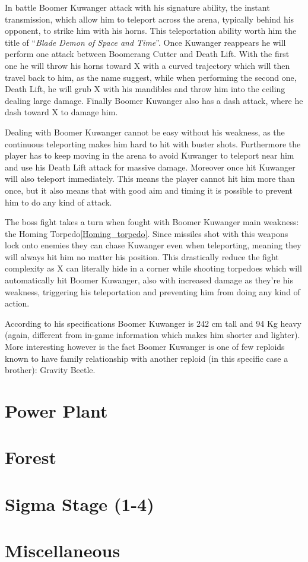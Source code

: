 In battle Boomer Kuwanger attack with his signature ability, the instant transmission, which allow him to teleport across the arena, typically behind his opponent, to strike him with his horns. This teleportation ability worth him the title of  ``\textit{Blade Demon of Space and Time}''\cite{book:MMX_Complete_art}. Once Kuwanger reappears he will perform one attack between Boomerang Cutter and Death Lift. With the first one he will throw his horns toward X with a curved trajectory which will then travel back to him, as the name suggest, while when performing the second one, Death Lift, he will grub X with his mandibles and throw him into the ceiling dealing large damage. Finally Boomer Kuwanger also has a dash attack, where he dash toward X to damage him.

Dealing with Boomer Kuwanger cannot be easy without his weakness, as the continuous teleporting makes him hard to hit with buster shots. Furthermore the player has to keep moving in the arena to avoid Kuwanger to teleport near him and use his Death Lift attack for massive damage. Moreover once hit Kuwanger will also teleport immediately. This means the player cannot hit him more than once, but it also means that with good aim and timing it is possible to prevent him to do any kind of attack. 

The boss fight takes a turn when fought with Boomer Kuwanger main weakness: the Homing Torpedo\ref{Homing_torpedo}. Since missiles shot with this weapons lock onto enemies they can chase Kuwanger even when teleporting, meaning they will always hit him no matter his position. This drastically reduce the fight complexity as X can literally hide in a corner while shooting torpedoes which will automatically hit Boomer Kuwanger, also with increased damage as they're his weakness, triggering his teleportation and preventing him from doing any kind of action.

According to his specifications Boomer Kuwanger is 242 cm tall and 94 Kg heavy (again, different from in-game information which makes him shorter and lighter). More interesting however is the fact Boomer Kuwanger is one of few reploids known to have family relationship with another reploid (in this specific case a brother): Gravity Beetle.%

\section{Power Plant}
\section{Forest}
\section{Sigma Stage (1-4)}
\section{Miscellaneous}\label{X1:misc} %